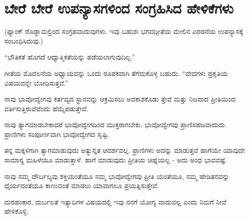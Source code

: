 
\chapter{ಬೇರೆ ಬೇರೆ ಉಪನ್ಯಾಸಗಳಿಂದ ಸಂಗ್ರಹಿಸಿದ ಹೇಳಿಕೆಗಳು}

(ಫ್ಯಾಂಕ್ ರೊಡ್ಹಾಮಲ್ರಿಂದ ಸಂಗ್ರಹವಾದುವುಗಳು. ಇವು ಬಹುಶಃ ಭಗವದ್ಗೀತೆಯ ಮೇಲಿನ ಎರಡನೆಯ ಉಪನ್ಯಾಸಕ್ಕೆ ಸಂಬಂಧಿಸಿದುವು.)

“ಭೌತಿಕತೆ ಹೊಗದೆ ಆಧ್ಯಾತ್ಮಿಕತೆಯನ್ನು ಪಡೆಯಲಾಗುವುದಿಲ್ಲ.”

ಗೀತೆಯ ಮೊದಲನೆಯ ಅಧ್ಯಾಯವನ್ನು ಒಂದು ರೂಪಕವಾಗಿ ತೆಗೆದುಕೊಳ್ಳ ಬಹುದು. “ವೇದಗಳು ಪ್ರಕೃತಿಯ ವಿಷಯವನ್ನೇ ಬೋಧಿಸುತ್ತವೆ.”

ನಾವು ಭಾವೋದ್ವೇಗವು ಕರ್ತವ್ಯದ ಸ್ಥಾನವನ್ನು ಆಕ್ರಮಿಸಲು ಅವಕಾಶಕೊಡು ತ್ತೇವೆ ಮತ್ತು ನಿಜವಾದ ಪ್ರೀತಿಯಿಂದ ವರ್ತಿಸುತ್ತಿರುವೆವೆಂದು ಹೆಮ್ಮೆಪಡುತ್ತೇವೆ.

ನಾವು ತ್ಯಾಗಮಾಡಬೇಕಾದರೆ ಭಾವೋದ್ವೇಗದಿಂದ ಮುಕ್ತರಾಗಬೇಕು. ಭಾವೋದ್ವೇಗವು ಪ್ರಾಣಿಸಹಜವಾದುದು. ಪ್ರಾಣಿಗಳು ಸಂಪೂರ್ಣವಾಗಿ ಭಾವೋದ್ವೇಗದ ಸೃಷ್ಟಿ.

ತನ್ನ ಮಕ್ಕಳಿಗಾಗಿ ತ್ಯಾಗಮಾಡುವುದು ಅತ್ಯುನ್ನತ ಆದರ್ಶವಲ್ಲ. ಪ್ರಾಣಿಗಳು ಅದನ್ನು ಮಾಡುತ್ತವೆ ಹಾಗೆಯೇ ಯಾವುದೇ ಸಾಮಾನ್ಯ ಮಹಿಳೆಯೂ ಮಾಡುತ್ತಾಳೆ. ಹಾಗೆ ಮಾಡುವುದು ಪ್ರೀತಿಯ ಚಿಹ್ನೆಯಲ್ಲ - ಅದು ಅಂಧ ಭಾವವಷ್ಟೆ.

ನಾವು ನಮ್ಮ ದೌರ್ಬಲ್ಯವು ಶಕ್ತಿಯಂತೆಯೂ ನಮ್ಮ ಭಾವೋದ್ವೇಗವು ಪ್ರೀತಿ ಯಂತೆಯೂ, ನಮ್ಮ ಹೇಡಿತನವನ್ನು ಧೈರ್ಯದಂತೆಯೂ ಕಾಣುವಂತೆ ಮಾಡಲು ಯಾವಾಗಲೂ ಪ್ರಯತ್ನಿಸುತ್ತೇವೆ.

ದುರಹಂಕಾರ, ದುರ್ಬಲತೆ ಇತ್ಯಾದಿಗಳ ವಿಷಯದಲ್ಲಿ ಇವು ನನಗೆ ಯೋಗ್ಯ ವಾದುವಲ್ಲ ಎಂದು ನಿಮಗೆ ನೀವೆ ಹೇಳಿಕೊಳ್ಳಿ.

